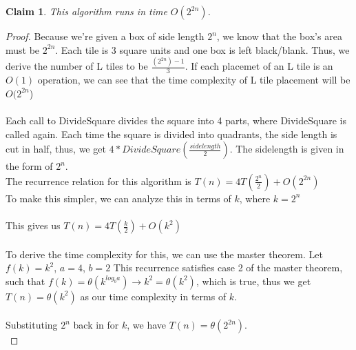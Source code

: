 \documentclass[11pt]{article}
\newtheorem{claim}[theorem]{Claim}
\begin{document}
	\begin{claim} 
		This algorithm runs in time $O(2^{2n})$.
	\end{claim}

	\begin{proof}
		Because we're given a box of side length $2^n$, we know that the box's area must be $2^{2n}$. Each tile is 3 square units and one box is left black/blank. Thus, we derive the number of L tiles to be $\frac{(2^{2n})-1}{3}$. If each placemet of an L tile is an $O(1)$ operation, we can see that the time complexity of L tile placement will be $O(2^{2n}$)\\
		\\
		Each call to DivideSquare divides the square into 4 parts, where DivideSquare is called again. Each time the square is divided into quadrants, the side length is cut in half, thus, we get $4* DivideSquare(\frac{sidelength}{2})$. The sidelength is given in the form of $2^n$. \\
		The recurrence relation for this algorithm is $T(n) = 4T(\frac{2^n}{2}) + O(2^{2n})$\\
		To make this simpler, we can analyze this in terms of $k$, where $k=2^n$\\
		\\
		This gives us $T(n) = 4T(\frac{k}{2}) + O(k^2)$\\
		\\
		To derive the time complexity for this, we can use the master theorem. Let $f(k) = k^2$, $a=4$, $b=2$
		This recurrence satisfies case 2 of the master theorem, such that $f(k)=\theta(k^{log_b a}) \rightarrow k^2= \theta(k^2)$, which is true, thus we get $T(n) = \theta(k^2)$ as our time complexity in terms of $k$. \\
		\\
		Substituting $2^n$ back in for $k$, we have $T(n)= \theta(2^{2n})$.\\
		
	\end{proof}
	
\end{document}
